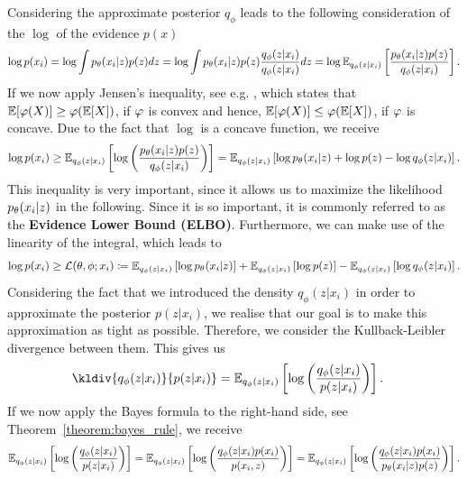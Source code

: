 Considering the approximate posterior $q_{\phi}$ leads to the following consideration of the $\log$ of the evidence $p(x)$
\begin{align}\label{eq:log_evidence}
\log p(x_i) = \log \int p_{\theta}(x_i|z) p(z) dz = \log \int p_{\theta}(x_i|z) p(z) \frac{q_{\phi}(z|x_i)}{q_{\phi}(z|x_i)}dz = \log \operatorname{\mathbb{E}}_{q_{\phi}(z|x_i)} \left[ \frac{p_{\theta}(x_i|z)p(z)}{q_{\phi}(z|x_i)}\right].
\end{align}
If we now apply Jensen's inequality, see e.g. \cite[Theorem~7.9]{klenke2013probability}, which states that $\operatorname{\mathbb{E}}[\operatorname{\varphi}(X)] \geq \operatorname{\varphi}(\operatorname{\mathbb{E}}[X])$, if $\operatorname{\varphi}$ is convex and hence, $\operatorname{\mathbb{E}}[\operatorname{\varphi}(X)] \leq \operatorname{\varphi}(\operatorname{\mathbb{E}}[X])$, if $\operatorname{\varphi}$ is concave. Due to the fact that $\log$ is a concave function, we receive
\begin{align*}
\log p(x_i) \geq \operatorname{\mathbb{E}}_{q_{\phi}(z|x_i)} \left[ \log\left(\frac{p_{\theta}(x_i|z)p(z)}{q_{\phi}(z|x_i)}\right)\right] = \operatorname{\mathbb{E}}_{q_{\phi}(z|x_i)} \left[ \log p_{\theta}(x_i|z) + \log p(z) - \log q_{\phi}(z|x_i)\right].
\end{align*}
This inequality is very important, since it allows us to maximize the likelihood $p_{\theta}(x_i|z)$ in the following. Since it is so important, it is commonly referred to as the \textbf{Evidence Lower Bound (ELBO)}. Furthermore, we can make use of the linearity of the integral, which leads to
\begin{align}\label{eq:elbo}
\log p(x_i) \geq \operatorname{\mathcal{L}}(\theta, \phi; x_i) \coloneqq \operatorname{\mathbb{E}}_{q_{\phi}(z|x_i)} \left[ \log p_{\theta}(x_i|z) \right] + \operatorname{\mathbb{E}}_{q_{\phi}(z|x_i)} \left[ \log p(z) \right] - \operatorname{\mathbb{E}}_{q_{\phi}(z|x_i)} \left[ \log q_{\phi}(z|x_i)\right].
\end{align}
Considering the fact that we introduced the density $q_{\phi}(z|x_i)$ in order to approximate the posterior $p(z|x_i)$, we realise that our goal is to make this approximation as tight as possible. Therefore, we consider the Kullback-Leibler divergence between them. This gives us
\begin{align*}
\kldiv{q_{\phi}(z|x_i)}{p(z|x_i)} &= \E_{q_{\phi}(z|x_i)} \left[ \log \left( \frac{q_{\phi}(z|x_i)}{p(z|x_i)} \right) \right].
\end{align*}
If we now apply the Bayes formula to the right-hand side, see Theorem~\ref{theorem:bayes_rule}, we receive
\begin{align*}
\operatorname{\mathbb{E}}_{q_{\phi}(z|x_i)} \left[ \log \left( \frac{q_{\phi}(z|x_i)}{p(z|x_i)} \right) \right]  = \operatorname{\mathbb{E}}_{q_{\phi}(z|x_i)} \left[ \log \left( \frac{q_{\phi}(z|x_i)p(x_i)}{p(x_i, z)} \right) \right] = \operatorname{\mathbb{E}}_{q_{\phi}(z|x_i)} \left[ \log \left( \frac{q_{\phi}(z|x_i)p(x_i)}{p_{\theta}(x_i| z)p(z)} \right) \right].
\end{align*}
